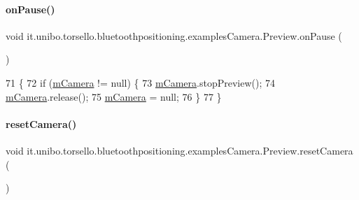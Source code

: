 \paragraph{\texorpdfstring{on\+Pause()}{onPause()}}
{\footnotesize\ttfamily void it.\+unibo.\+torsello.\+bluetoothpositioning.\+examples\+Camera.\+Preview.\+on\+Pause (\begin{DoxyParamCaption}{ }\end{DoxyParamCaption})}


\begin{DoxyCode}
71                           \{
72         \textcolor{keywordflow}{if} (\hyperlink{classit_1_1unibo_1_1torsello_1_1bluetoothpositioning_1_1examplesCamera_1_1Preview_a1690c2d132a340b5726ef9712e961dd9_a1690c2d132a340b5726ef9712e961dd9}{mCamera} != null) \{
73             \hyperlink{classit_1_1unibo_1_1torsello_1_1bluetoothpositioning_1_1examplesCamera_1_1Preview_a1690c2d132a340b5726ef9712e961dd9_a1690c2d132a340b5726ef9712e961dd9}{mCamera}.stopPreview();
74             \hyperlink{classit_1_1unibo_1_1torsello_1_1bluetoothpositioning_1_1examplesCamera_1_1Preview_a1690c2d132a340b5726ef9712e961dd9_a1690c2d132a340b5726ef9712e961dd9}{mCamera}.release();
75             \hyperlink{classit_1_1unibo_1_1torsello_1_1bluetoothpositioning_1_1examplesCamera_1_1Preview_a1690c2d132a340b5726ef9712e961dd9_a1690c2d132a340b5726ef9712e961dd9}{mCamera} = null;
76         \}
77     \}
\end{DoxyCode}
\hypertarget{classit_1_1unibo_1_1torsello_1_1bluetoothpositioning_1_1examplesCamera_1_1Preview_a26bdf3a50e5e5044510f2ba1583ce8d8_a26bdf3a50e5e5044510f2ba1583ce8d8}{}\label{classit_1_1unibo_1_1torsello_1_1bluetoothpositioning_1_1examplesCamera_1_1Preview_a26bdf3a50e5e5044510f2ba1583ce8d8_a26bdf3a50e5e5044510f2ba1583ce8d8} 
\paragraph{\texorpdfstring{reset\+Camera()}{resetCamera()}}
{\footnotesize\ttfamily void it.\+unibo.\+torsello.\+bluetoothpositioning.\+examples\+Camera.\+Preview.\+reset\+Camera (\begin{DoxyParamCaption}{ }\end{DoxyParamCaption})}


